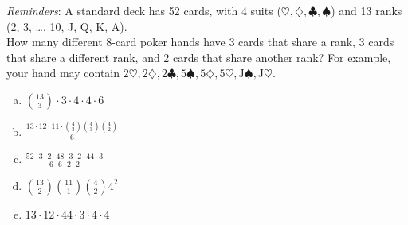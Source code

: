 \emph{Reminders}: A standard deck has 52 cards, with 4 suits ($\heartsuit, \diamondsuit, \clubsuit, \spadesuit
$) and 13 ranks (2, 3, \dots, 10, J, Q, K, A).\\

\noindent
How many different 8-card poker hands have 3 cards that share a rank, 3 cards that share a different rank, and 2 cards that share another rank? For example, your hand may contain $2\heartsuit, 2\diamondsuit, 2\clubsuit, 5\spadesuit, 5\diamondsuit, 5\heartsuit,\text{J}\spadesuit,\text{J}\heartsuit$.

\begin{enumerate}[(a)]
	\item  $\binom{13}{3}\cdot 3\cdot 4\cdot 4\cdot 6{}$

	\item  $\frac{13\cdot 12\cdot 11\cdot\binom{4}{3}\binom{4}{3}\binom{4}{2}}{6}$

	\item  $\frac{52\cdot 3\cdot 2\cdot 48\cdot 3\cdot 2\cdot 44\cdot 3}{6\cdot 6\cdot 2\cdot 2}$

	\item  $\binom{13}{2}\binom{11}{1}\binom{4}{2}4^2$

	\item  $13\cdot 12\cdot 44 \cdot 3\cdot 4\cdot 4$

\end{enumerate}
